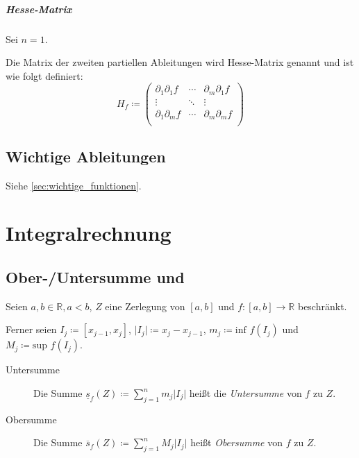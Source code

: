 \documentclass[a4paper, 11pt, accentcolor = tud3b]{tudreport}
\begin{document}
            \paragraph{Hesse-Matrix}
                Sei $ n = 1 $.

                Die Matrix der zweiten partiellen Ableitungen wird Hesse-Matrix genannt und ist wie folgt definiert:
                \begin{equation*}
                    H _ f \coloneqq
                    \begin{pmatrix}
                        \partial _ 1 \partial _ 1 f & \cdots & \partial _ m \partial _ 1 f \\
                        \vdots & \ddots & \vdots \\
                        \partial _ 1 \partial _ m f & \cdots & \partial _ m \partial _ m f \\
                    \end{pmatrix}
                \end{equation*}

        \section{Wichtige Ableitungen}
            Siehe \ref{sec:wichtige_funktionen}.

    \chapter{Integralrechnung}
        \section{Ober-/Untersumme und}
            Seien $ a, b \in \mathbb{R}, a < b $, $ Z $ eine Zerlegung von $ [a, b] $ und $ f : [a, b] \rightarrow \mathbb{R} $ beschränkt.

            Ferner seien $ I _ j \coloneqq [x _ { j - 1 }, x _ j] $, $ \lvert I _ j \rvert \coloneqq x _ j - x _ { j - 1 } $, $ m _ j \coloneqq \text{inf } f(I _ j) $ und $ M _ j \coloneqq \text{sup } f(I _ j) $.

            \begin{description}
                \item[Untersumme] Die Summe $ \underline{s} _ f (Z) \coloneqq \sum _ { j = 1 } ^ n m _ j \lvert I _ j \rvert $ heißt die \textit{Untersumme} von $ f $ zu $ Z $.
                \item[Obersumme] Die Summe $ \overline{s} _ f (Z) \coloneqq \sum _ { j = 1 } ^ n M _ j \lvert I _ j \rvert $ heißt \textit{Obersumme} von $ f $ zu $ Z $.
            \end{description}
\end{document}
